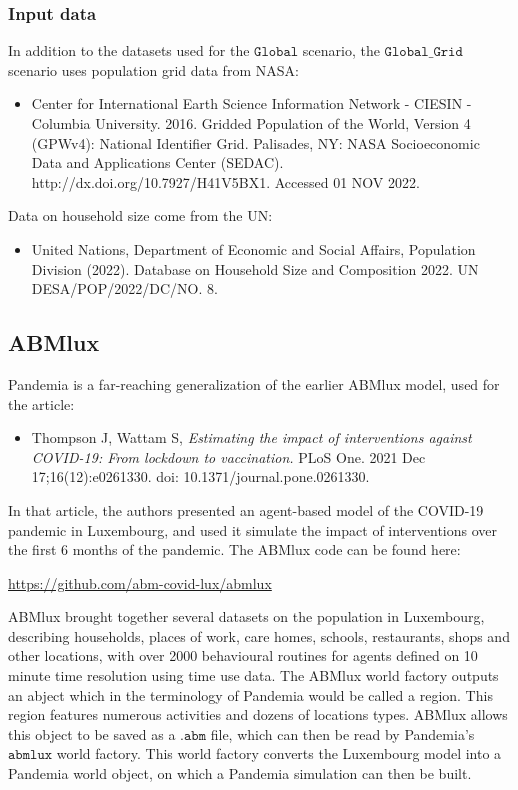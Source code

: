 \documentclass[10pt,letterpaper]{article}
\begin{document}
\subsubsection*{Input data}

\noindent In addition to the datasets used for the $\texttt{Global}$ scenario, the $\texttt{Global{\_}Grid}$ scenario uses population grid data from NASA:

\begin{itemize}
\item[] Center for International Earth Science Information Network - CIESIN - Columbia University. 2016. Gridded Population of the World, Version 4 (GPWv4): National Identifier Grid. Palisades, NY: NASA Socioeconomic Data and Applications Center (SEDAC). http://dx.doi.org/10.7927/H41V5BX1. Accessed 01 NOV 2022.
\end{itemize}

\noindent Data on household size come from the UN:

\begin{itemize}
\item[] United Nations, Department of Economic and Social Affairs, Population Division (2022). Database on Household Size and Composition 2022. UN DESA/POP/2022/DC/NO. 8.
\end{itemize}

\subsection{ABMlux}

Pandemia is a far-reaching generalization of the earlier ABMlux model, used for the article:
\begin{itemize}
\item[] Thompson J, Wattam S, \textit{Estimating the impact of interventions against COVID-19: From lockdown to vaccination.} PLoS One. 2021 Dec 17;16(12):e0261330. doi: 10.1371/journal.pone.0261330.
\end{itemize}
In that article, the authors presented an agent-based model of the COVID-19 pandemic in Luxembourg, and used it simulate the impact of interventions over the first 6 months of the pandemic. The ABMlux code can be found here:
\begin{center}
\url{https://github.com/abm-covid-lux/abmlux}
\end{center}

ABMlux brought together several datasets on the population in Luxembourg, describing households, places of work, care homes, schools, restaurants, shops and other locations, with over 2000 behavioural routines for agents defined on 10 minute time resolution using time use data. The ABMlux world factory outputs an abject which in the terminology of Pandemia would be called a region. This region features numerous activities and dozens of locations types. ABMlux allows this object to be saved as a $\texttt{.abm}$ file, which can then be read by Pandemia's $\texttt{abmlux}$ world factory. This world factory converts the Luxembourg model into a Pandemia world object, on which a Pandemia simulation can then be built.
\end{document}

